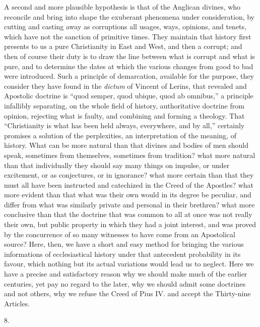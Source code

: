 A second and more plausible hypothesis is that of the
Anglican divines, who reconcile and bring into shape the
exuberant phenomena under consideration, by cutting and
casting away as corruptions all usages, ways, opinions,
and tenets, which have not the sanction of primitive
times. They maintain that history first presents to us a
pure Christianity in East and West, and then a corrupt;
and then of course their duty is to draw the line between
what is corrupt and what is pure, and to determine the
dates at which the various changes from good to bad were
introduced. Such a principle of demarcation, available
for the purpose, they consider they have found in the \emph{dictum}
of Vincent of Lerins, that revealed and Apostolic
doctrine is ``quod semper, quod ubique, quod ab
omnibus,'' a principle infallibly separating, on the
whole field of history, authoritative doctrine from
opinion, rejecting what is faulty, and combining and
forming a theology. That ``Christianity is what has
been held always, everywhere, and by all,'' certainly
promises a solution of the perplexities, an
interpretation of the meaning, of history. What can be
more natural than that divines and bodies of men should
speak, sometimes from themselves, sometimes from
tradition? what more natural than that individually they
should say many things on impulse, or under excitement,
or as conjectures, or in ignorance? what more certain
than that they must all have been instructed and
catechized in the Creed of the Apostles? what more
evident than that what was their own would in its degree
be peculiar, and differ from what was similarly private
and personal in their brethren? what more conclusive than
that the doctrine that was common to all at once was not
really their own, but public property in which they had a
joint interest, and was proved by the concurrence of so
many witnesses to have come from an Apostolical source?
Here, then, we have a short and easy method for bringing
the various informations of ecclesiastical history under
that antecedent probability in its favour, which nothing
but its actual variations would lead us to neglect. Here
we have a precise and satisfactory reason why we should
make much of the earlier centuries, yet pay no regard to
the later, why we should admit some doctrines and not
others, why we refuse the Creed of Pius IV. and accept
the Thirty-nine Articles.

8.

